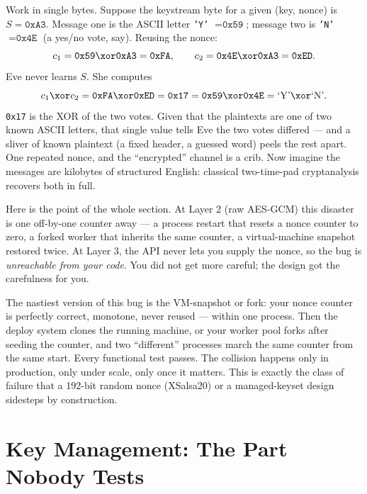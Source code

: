 \begin{example}
\label{ch39:nonce-reuse-ex}
Work in single bytes. Suppose the keystream byte for a given (key, nonce) is
$S = \texttt{0xA3}$. Message one is the ASCII letter \texttt{'Y'} $= \texttt{0x59}$;
message two is \texttt{'N'} $= \texttt{0x4E}$ (a yes/no vote, say). Reusing the
nonce:
\[
c_1 = \texttt{0x59} \xor \texttt{0xA3} = \texttt{0xFA}, \qquad
c_2 = \texttt{0x4E} \xor \texttt{0xA3} = \texttt{0xED}.
\]
Eve never learns $S$. She computes
\[
c_1 \xor c_2 = \texttt{0xFA} \xor \texttt{0xED} = \texttt{0x17}
            = \texttt{0x59} \xor \texttt{0x4E} = \text{`Y'} \xor \text{`N'} .
\]
\texttt{0x17} is the XOR of the two votes. Given that the plaintexts are one of two
known ASCII letters, that single value tells Eve the two votes differed --- and a
sliver of known plaintext (a fixed header, a guessed word) peels the rest apart.
One repeated nonce, and the ``encrypted'' channel is a crib. Now imagine the
messages are kilobytes of structured English: classical two-time-pad cryptanalysis
recovers both in full.
\end{example}

Here is the point of the whole section. At Layer 2 (raw AES-GCM) this disaster is
one off-by-one counter away --- a process restart that resets a nonce counter to
zero, a forked worker that inherits the same counter, a virtual-machine snapshot
restored twice. At Layer 3, the API never lets you supply the nonce, so the bug is
\emph{unreachable from your code}. You did not get more careful; the design got
the carefulness for you.

\begin{trapbox}
The nastiest version of this bug is the VM-snapshot or fork: your nonce counter is
perfectly correct, monotone, never reused --- within one process. Then the deploy
system clones the running machine, or your worker pool forks after seeding the
counter, and two ``different'' processes march the same counter from the same
start. Every functional test passes. The collision happens only in production,
only under scale, only once it matters. This is exactly the class of failure that
a 192-bit random nonce (XSalsa20) or a managed-keyset design sidesteps by
construction.
\end{trapbox}

\section{Key Management: The Part Nobody Tests}
\label{ch39:keymgmt}


